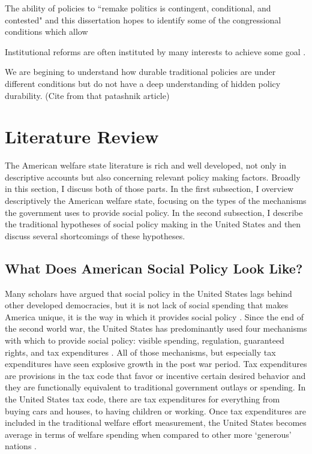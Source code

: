 \documentclass[12pt]{article}
\begin{document}
The ability of policies to ``remake politics is contingent, conditional, and contested" \citep[Pg. 172]{patashnik2013} and this dissertation hopes to identify some of the congressional conditions which allow 

Institutional reforms are often instituted by many interests to achieve some goal \citep{schickler2001}.

We are begining to understand how durable traditional policies are under different conditions but do not have a deep understanding of hidden policy durability. (Cite from that patashnik article) 

\section{Literature Review}

The American welfare state literature is rich and well developed, not only in descriptive accounts but also concerning relevant policy making factors. Broadly in this section, I discuss both of those parts. In the first subsection, I overview descriptively the American welfare state, focusing on the types of the mechanisms the government uses to provide social policy. In the second subsection, I describe the traditional hypotheses of social policy making in the United States and then discuss several shortcomings of these hypotheses. 

\subsection{What Does American Social Policy Look Like?}
Many scholars have argued that social policy in the United States lags behind other developed democracies, but it is not lack of social spending that makes America unique, it is the way in which it provides social policy \citep{hacker2002}. Since the end of the second world war, the United States has predominantly used four mechanisms with which to provide social policy: visible spending, regulation, guaranteed rights, and tax expenditures \citep{pierson2007}. All of those mechanisms, but especially tax expenditures have seen explosive growth in the post war period. Tax expenditures are provisions in the tax code that favor or incentive  certain desired behavior and they are functionally equivalent to traditional government outlays or spending. In the United States tax code, there are tax expenditures for everything from buying cars and houses, to having children or working. Once tax expenditures are included in the traditional welfare effort measurement, the United States becomes average in terms of welfare spending when compared to other more `generous' nations \citep[Ch. 1]{howard2008}.
\end{document}
